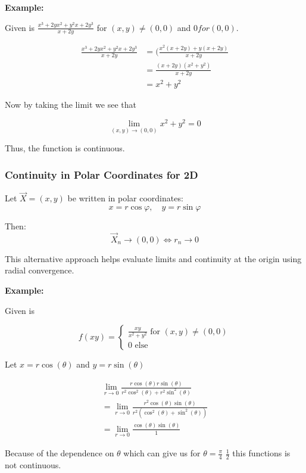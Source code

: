 \textbf{Example:}
\vspace{\baselineskip}

Given is \(\frac{x^3 + 2yx^2 + y^2x + 2y^3}{x + 2y}\) for \((x,y) \ne (0,0)\) and \(0 for (0,0)\).

\begin{align*}
\frac{x^3 + 2yx^2 + y^2x + 2y^3}{x + 2y} &= (\frac{x^2(x + 2y) + y(x + 2y)}{x + 2y}\\
&= \frac{(x + 2y)(x^2 + y^2)}{x + 2y}\\
&= x^2 + y^2
\end{align*}

Now by taking the limit we see that

\[
\lim_{(x,y) \to (0,0)} x^2 + y^2 = 0
\]

Thus, the function is continuous.


\subsubsection{Continuity in Polar Coordinates for 2D}

Let \( \vec{X} = (x, y) \) be written in polar coordinates:
\[
x = r \cos \varphi, \quad y = r \sin \varphi
\]

Then:
\[
\vec{X}_n \to (0, 0) \iff r_n \to 0
\]

This alternative approach helps evaluate limits and continuity at the origin using radial convergence.
\vspace{\baselineskip}

\textbf{Example:}
\vspace{\baselineskip}

Given is 

\[
f(xy) = 
\begin{cases}   
\frac{xy}{x^2 + y^2} \text{ for } (x,y) \ne (0,0) \\ 
0 \text{ else }
\end{cases}
\]

Let \(x = r\cos(\theta)\) and \(y = r\sin(\theta)\)

\begin{align*}
\lim_{r \to 0} \frac{r\cos(\theta)r\sin(\theta)}{r^2\cos^2(\theta) + r^2\sin^2(\theta)}\\
= \lim_{r \to 0} \frac{r^2\cos(\theta)\sin(\theta)}{r^2(\cos^2(\theta) + \sin^2(\theta))}\\
= \lim_{r \to 0} \frac{\cos(\theta)\sin(\theta)}{1}
\end{align*}

Because of the dependence on \(\theta\) which can give us for \(\theta = \frac{\pi}{4}\) \(\frac{1}{2}\) 
this functions is not continuous.



